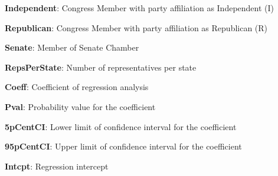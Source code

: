 \documentclass[11pt]{article}
\begin{document}
\begin{table}[h]
\caption{\protect\hyperlink{file-table-2-pkl}{Regression analysis of interactions count by Party, Chamber, and the number of representatives per State}}
\label{table:regress_interactions}
\begin{threeparttable}
\renewcommand{\TPTminimum}{\linewidth}
\begin{tablenotes}
\footnotesize
\item \textbf{Independent}: Congress Member with party affiliation as Independent (I)
\item \textbf{Republican}: Congress Member with party affiliation as Republican (R)
\item \textbf{Senate}: Member of Senate Chamber
\item \textbf{RepsPerState}: Number of representatives per state
\item \textbf{Coeff}: Coefficient of regression analysis
\item \textbf{Pval}: Probability value for the coefficient
\item \textbf{5pCentCI}: Lower limit of confidence interval for the coefficient
\item \textbf{95pCentCI}: Upper limit of confidence interval for the coefficient
\item \textbf{Intcpt}: Regression intercept
\end{tablenotes}
\end{threeparttable}
\end{table}
\end{document}

